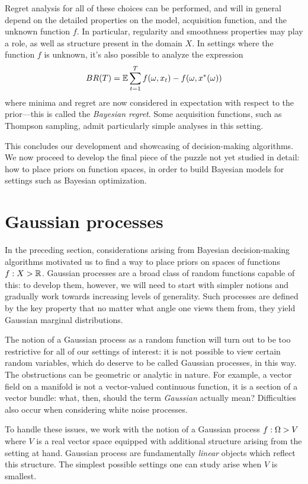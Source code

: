 \documentclass[11pt]{book}
\begin{document}
Regret analysis for all of these choices can be performed, and will in general depend on the detailed properties on the model, acquisition function, and the unknown function $f$.
In particular, regularity and smoothness properties may play a role, as well as structure present in the domain $X$.
In settings where the function $f$ is unknown, it's also possible to analyze the expression 
\[
BR(T) = \operatorname{\mathbb{E}} \sum_{t=1}^T f(\omega,x_t) - f(\omega,x^*(\omega))    
\]
where minima and regret are now considered in expectation with respect to the prior---this is called the \emph{Bayesian regret}.
Some acquisition functions, such as Thompson sampling, admit particularly simple analyses in this setting.

This concludes our development and showcasing of decision-making algorithms.
We now proceed to develop the final piece of the puzzle not yet studied in detail: how to place priors on function spaces, in order to build Bayesian models for settings such as Bayesian optimization.

\section{Gaussian processes}

In the preceding section, considerations arising from Bayesian decision-making algorithms motivated us to find a way to place priors on spaces of functions $f : X \-> \mathbb{R}$.
Gaussian processes are a broad class of random functions capable of this: to develop them, however, we will need to start with simpler notions and gradually work towards increasing levels of generality.
Such processes are defined by the key property that no matter what angle one views them from, they yield Gaussian marginal distributions.

The notion of a Gaussian process as a random function will turn out to be too restrictive for all of our settings of interest: it is not possible to view certain random variables, which do deserve to be called Gaussian processes, in this way.
The obstructions can be geometric or analytic in nature.
For example, a vector field on a manifold is not a vector-valued continuous function, it is a section of a vector bundle: what, then, should the term \emph{Gaussian} actually mean?
Difficulties also occur when considering white noise processes.

To handle these issues, we work with the notion of a Gaussian process $f : \Omega \-> V$ where $V$ is a real vector space equipped with additional structure arising from the setting at hand.
Gaussian process are fundamentally \emph{linear} objects which reflect this structure.
The simplest possible settings one can study arise when $V$ is smallest.
\end{document}
